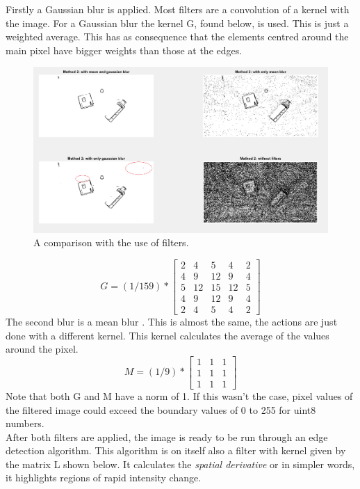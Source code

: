 \documentclass{article}
\begin{document}
Firstly a Gaussian blur\cite{gaussian} is applied. Most filters are a convolution of a kernel with the image. For a Gaussian blur the kernel G, found below, is used. This is just a weighted average. This has as consequence that the elements centred around the main pixel have bigger weights than those at the edges.
\begin{figure}[h]
\center
\includegraphics[width=0.7\linewidth]{filter_comparison.png}
\caption{A comparison with the use of filters.}
\label{fig:filter_comparison}
\end{figure}
\begin{equation}
G = (1/159) * 
\begin{bmatrix}
2 & 4 & 5 & 4 & 2\\
4 & 9 & 12 & 9 & 4\\
5 & 12 & 15 & 12 & 5\\
4 & 9 & 12 & 9& 4\\
2 & 4 & 5 & 4 & 2
\end{bmatrix}
\end{equation}
The second blur is a mean blur \cite{mean}. This is almost the same, the actions are just done with a different kernel. This kernel calculates the average of the values around the pixel.
\begin{equation}
M = (1/9) * 
\begin{bmatrix}
1&1&1\\
1&1&1\\
1&1&1
\end{bmatrix}
\end{equation}
Note that both G and M have a norm of 1. If this wasn't the case, pixel values of the filtered image could exceed the boundary values of 0 to 255 for uint8 numbers. \\
After both filters are applied, the image is ready to be run through an edge detection algorithm\cite{edge_detection}. This algorithm is on itself also a filter with kernel given by the matrix L shown below.
It calculates the \textit{spatial derivative} or in simpler words, it highlights regions of rapid intensity change.
\end{document}

